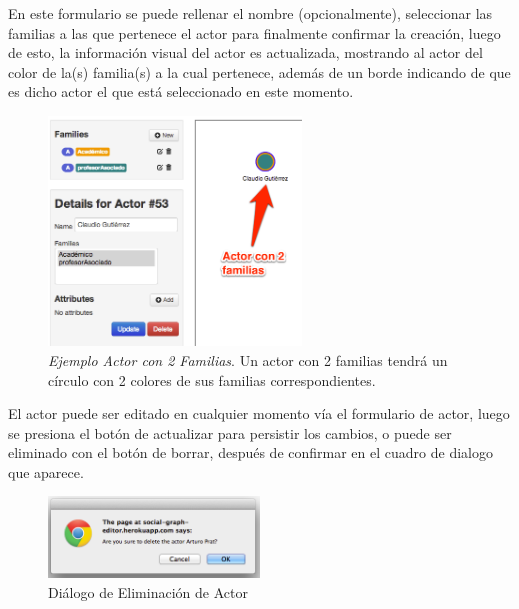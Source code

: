 En este formulario se puede rellenar el nombre (opcionalmente), seleccionar las familias a las que pertenece el actor para finalmente confirmar la creación, luego de esto, la información visual del actor es actualizada, mostrando al actor del color de la(s) familia(s) a la cual pertenece, además de un borde indicando de que es dicho actor el que está seleccionado en este momento.\\

\begin{figure}[H]
  \centering
  \includegraphics[width=0.6\textwidth]{images/ejemplo_actor_2_familias.png}
  \caption[Ejemplo Actor con 2 Familias]{\emph{Ejemplo Actor con 2 Familias}. Un actor con 2 familias tendrá un círculo con 2 colores de sus familias correspondientes.}
  \label{ejemplo_actor_2_familias}
\end{figure}

El actor puede ser editado en cualquier momento vía el formulario de actor, luego se presiona el botón de actualizar para persistir los cambios, o puede ser eliminado con el botón de borrar, después de confirmar en el cuadro de dialogo que aparece.

\begin{figure}[H]
  \centering
  \includegraphics[width=0.5\textwidth]{images/dialogo_eliminacion_actor.png}
  \caption{Diálogo de Eliminación de Actor}
  \label{dialogo_eliminacion_actor}
\end{figure}



